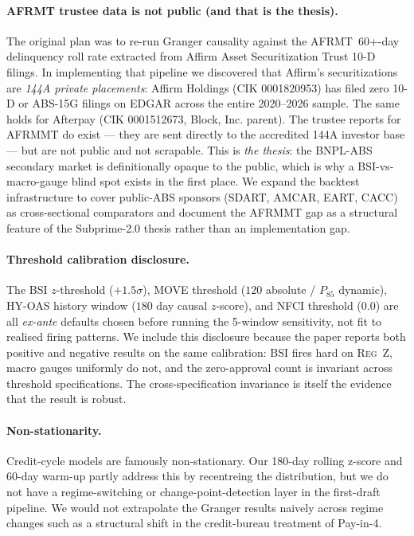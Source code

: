 \documentclass[11pt,letterpaper]{article}
\begin{document}
\paragraph{AFRMT trustee data is not public (and that is the thesis).}
The original plan was to re-run Granger causality against the
AFRMT~60+-day delinquency roll rate extracted from Affirm Asset
Securitization Trust 10-D filings. In implementing that pipeline we
discovered that Affirm's securitizations are \emph{144A private
placements}: Affirm Holdings (CIK 0001820953) has filed zero 10-D or
ABS-15G filings on EDGAR across the entire 2020--2026 sample. The
same holds for Afterpay (CIK 0001512673, Block, Inc. parent). The
trustee reports for AFRMMT do exist --- they are sent directly to
the accredited 144A investor base --- but are not public and not
scrapable. This is \emph{the thesis}: the BNPL-ABS secondary market
is definitionally opaque to the public, which is why a
BSI-vs-macro-gauge blind spot exists in the first place. We expand
the backtest infrastructure to cover public-ABS sponsors (SDART,
AMCAR, EART, CACC) as cross-sectional comparators and document the
AFRMMT gap as a structural feature of the Subprime-2.0 thesis
rather than an implementation gap.

\paragraph{Threshold calibration disclosure.}
The BSI $z$-threshold ($+1.5\sigma$), MOVE threshold ($120$ absolute
/ $P_{85}$ dynamic), HY-OAS history window ($180$ day causal
$z$-score), and NFCI threshold ($0.0$) are all \emph{ex-ante} defaults
chosen before running the 5-window sensitivity, not fit to realised
firing patterns. We include this disclosure because the paper reports
both positive and negative results on the same calibration: BSI fires
hard on \textsc{Reg~Z}, macro gauges uniformly do not, and the
zero-approval count is invariant across threshold specifications.
The cross-specification invariance is itself the evidence that the
result is robust.

\paragraph{Non-stationarity.}
Credit-cycle models are famously non-stationary. Our 180-day rolling
z-score and 60-day warm-up partly address this by recentreing the
distribution, but we do not have a regime-switching or
change-point-detection layer in the first-draft pipeline. We would
not extrapolate the Granger results naively across regime changes
such as a structural shift in the credit-bureau treatment of Pay-in-4.
\end{document}
